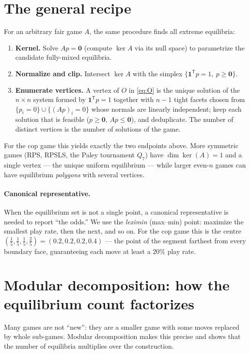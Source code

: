 \documentclass[11pt]{article}
\newcommand{\ones}{\mathbf{1}}
\newcommand{\zero}{\mathbf{0}}
\theoremstyle{plain}
\theoremstyle{definition}
\begin{document}
\section{The general recipe}

For an arbitrary fair game $A$, the same procedure finds all extreme equilibria:

\begin{enumerate}[leftmargin=2em]
  \item \textbf{Kernel.} Solve $Ap=\zero$ (compute $\ker A$ via its null space) to
  parametrize the candidate fully-mixed equilibria.
  \item \textbf{Normalize and clip.} Intersect $\ker A$ with the simplex
  $\{\ones^{\mathsf T}p=1,\ p\ge\zero\}$.
  \item \textbf{Enumerate vertices.} A vertex of $O$ in \eqref{eq:O} is the unique
  solution of the $n\times n$ system formed by $\ones^{\mathsf T}p=1$ together with
  $n-1$ tight facets chosen from $\{p_i=0\}\cup\{(Ap)_i=0\}$ whose normals are
  linearly independent; keep each solution that is feasible
  ($p\ge\zero$, $Ap\le\zero$), and deduplicate. The number of distinct vertices is
  the number of solutions of the game.
\end{enumerate}

For the cop game this yields exactly the two endpoints above. More symmetric games
(RPS, RPSLS, the Paley tournament $Q_7$) have $\dim\ker(A)=1$ and a single vertex ---
the unique uniform equilibrium --- while larger even-$n$ games can have equilibrium
\emph{polygons} with several vertices.

\paragraph{Canonical representative.}
When the equilibrium set is not a single point, a canonical representative is needed
to report ``the odds.'' We use the \emph{leximin} (max--min) point: maximize the
smallest play rate, then the next, and so on. For the cop game this is the centre
$(\tfrac15,\tfrac15,\tfrac15,\tfrac25)=(0.2,0.2,0.2,0.4)$ --- the point of the segment
farthest from every boundary face, guaranteeing each move at least a $20\%$ play
rate.

\section{Modular decomposition: how the equilibrium count factorizes}

Many games are not ``new'': they are a smaller game with some moves replaced by
whole sub-games. Modular decomposition makes this precise and shows that the number
of equilibria multiplies over the construction.
\end{document}

